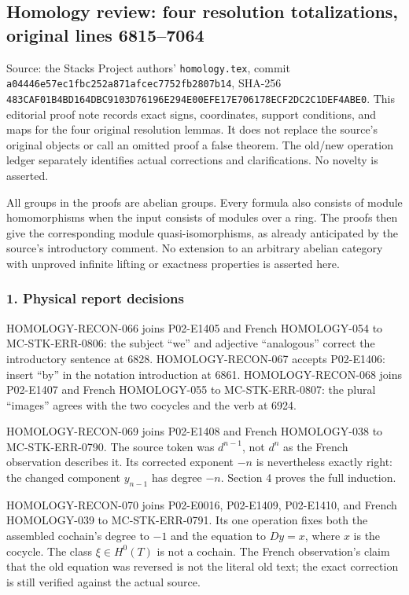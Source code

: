 \subsection{Homology review: four resolution totalizations, original lines 6815--7064}\label{homology-review-four-resolution-totalizations-original-lines-68157064}

Source: the Stacks Project authors' \texttt{homology.tex}, commit \texttt{a04446e57ec1fbc252a871afcec7752fb2807b14}, SHA-256 \texttt{483CAF01B4BD164DBC9103D76196E294E00EFE17E706178ECF2DC2C1DEF4ABE0}. This editorial proof note records exact signs, coordinates, support conditions, and maps for the four original resolution lemmas. It does not replace the source's original objects or call an omitted proof a false theorem. The old/new operation ledger separately identifies actual corrections and clarifications. No novelty is asserted.

All groups in the proofs are abelian groups. Every formula also consists of module homomorphisms when the input consists of modules over a ring. The proofs then give the corresponding module quasi-isomorphisms, as already anticipated by the source's introductory comment. No extension to an arbitrary abelian category with unproved infinite lifting or exactness properties is asserted here.

\subsubsection{1. Physical report decisions}\label{physical-report-decisions}

HOMOLOGY-RECON-066 joins P02-E1405 and French HOMOLOGY-054 to MC-STK-ERR-0806: the subject ``we'' and adjective ``analogous'' correct the introductory sentence at 6828. HOMOLOGY-RECON-067 accepts P02-E1406: insert ``by'' in the notation introduction at 6861. HOMOLOGY-RECON-068 joins P02-E1407 and French HOMOLOGY-055 to MC-STK-ERR-0807: the plural ``images'' agrees with the two cocycles and the verb at 6924.

HOMOLOGY-RECON-069 joins P02-E1408 and French HOMOLOGY-038 to MC-STK-ERR-0790. The source token was \(d^{n-1}\), not \(d^n\) as the French observation describes it. Its corrected exponent \(-n\) is nevertheless exactly right: the changed component \(y_{n-1}\) has degree \(-n\). Section 4 proves the full induction.

HOMOLOGY-RECON-070 joins P02-E0016, P02-E1409, P02-E1410, and French HOMOLOGY-039 to MC-STK-ERR-0791. Its one operation fixes both the assembled cochain's degree to \(-1\) and the equation to \(Dy=x\), where \(x\) is the cocycle. The class \(\xi\in H^0(T)\) is not a cochain. The French observation's claim that the old equation was reversed is not the literal old text; the exact correction is still verified against the actual source.


